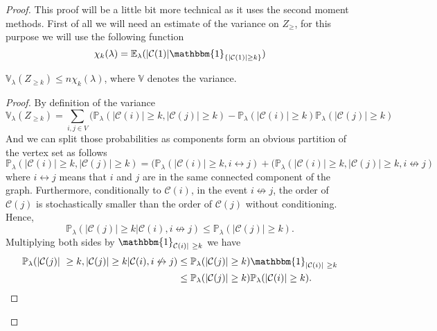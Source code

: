\begin{proof}
	This proof will be a little bit more technical as it uses the second moment methods.
	First of all we will need an estimate of the variance on $Z_{\geq}$, for this purpose we will use the following function
	\begin{equation}
		\chi_k(\lambda) = \mathbb{E}_{\lambda}(|\mathcal{C}(1)|\mathbbm{1}_{\{|\mathcal{C}(1)| \geq k\}})
	\end{equation}
	\begin{lemma}
		$\mathbb{V}_{\lambda}(Z_{\geq k}) \leq n\chi_k(\lambda)$, where $\mathbb{V}$ denotes the variance.
	\end{lemma}
	\begin{proof}
		By definition of the variance
		\begin{equation}
			\mathbb{V}_{\lambda}(Z_{\geq k}) = \sum_{i,j \in V}(\mathbb{P}_{\lambda}(|\mathcal{C}(i)| \geq k, |\mathcal{C}(j)| \geq k)
				-\mathbb{P}_{\lambda}(|\mathcal{C}(i)| \geq k)\mathbb{P}_{\lambda}(|\mathcal{C}(j)| \geq k)
		\end{equation}
		And we can split those probabilities as components form an obvious partition of the vertex set as follows
		\begin{equation}
			\mathbb{P}_{\lambda}(|\mathcal{C}(i)| \geq k, |\mathcal{C}(j)| \geq k) 
			= (\mathbb{P}_{\lambda}(|\mathcal{C}(i)| \geq k, i \leftrightarrow j) 
			+ (\mathbb{P}_{\lambda}(|\mathcal{C}(i)| \geq k, |\mathcal{C}(j)| \geq k, i \not\leftrightarrow j)
		\end{equation}
		where $i\leftrightarrow j$ means that $i$ and $j$ are in the same connected component of the graph.
		Furthermore, conditionally to $\mathcal{C}(i)$, in the event $i \not\leftrightarrow j$, the order of $\mathcal{C}(j)$ is stochastically smaller than the order of $\mathcal{C}(j)$ without conditioning.
		Hence,
		\begin{equation}
			\mathbb{P}_{\lambda}(|\mathcal{C}(j)| \geq k | \mathcal{C}(i), i \not\leftrightarrow j) \leq \mathbb{P}_{\lambda}(|\mathcal{C}(j)| \geq k).
		\end{equation}
		Multiplying both sides by $\mathbbm{1}_{\mathcal{C}(i)| \geq k}$ we have
		\begin{align}
			\mathbb{P}_{\lambda}(|\mathcal{C}(j)| \geq k, |\mathcal{C}(j)| \geq k | \mathcal{C}(i), i \not\leftrightarrow j) 
			&\leq \mathbb{P}_{\lambda}(|\mathcal{C}(j)| \geq k)\mathbbm{1}_{|\mathcal{C}(i)| \geq k}\\
			&\leq \mathbb{P}_{\lambda}(|\mathcal{C}(j)| \geq k)\mathbb{P}_{\lambda}(|\mathcal{C}(i)| \geq k).

\end{align}
\end{proof}
\end{proof}
